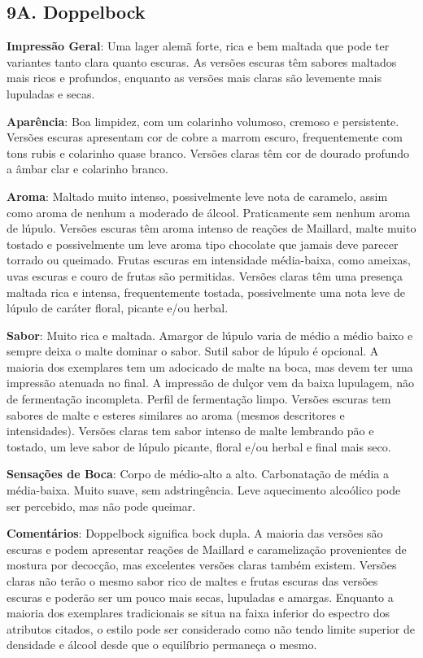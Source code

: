 \subsection*{9A. Doppelbock}

\textbf{Impressão Geral}: Uma lager alemã forte, rica e bem maltada que pode ter variantes tanto clara quanto escuras. As versões escuras têm sabores maltados mais ricos e profundos, enquanto as versões mais claras são levemente mais lupuladas e secas.

\textbf{Aparência}: Boa limpidez, com um colarinho volumoso, cremoso e persistente. Versões escuras apresentam cor de cobre a marrom escuro, frequentemente com tons rubis e colarinho quase branco. Versões claras têm cor de dourado profundo a âmbar clar e colarinho branco.

\textbf{Aroma}: Maltado muito intenso, possivelmente leve nota de caramelo, assim como aroma de nenhum a moderado de álcool. Praticamente sem nenhum aroma de lúpulo. Versões escuras têm aroma intenso de reações de Maillard, malte muito tostado e possivelmente um leve aroma tipo chocolate que jamais deve parecer torrado ou queimado. Frutas escuras em intensidade média-baixa, como ameixas, uvas escuras e couro de frutas são permitidas. Versões claras têm uma presença maltada rica e intensa, frequentemente tostada, possivelmente uma nota leve de lúpulo de caráter floral, picante e/ou herbal.

\textbf{Sabor}: Muito rica e maltada. Amargor de lúpulo varia de médio a médio baixo e sempre deixa o malte dominar o sabor. Sutil sabor de lúpulo é opcional. A maioria dos exemplares tem um adocicado de malte na boca, mas devem ter uma impressão atenuada no final. A impressão de dulçor vem da baixa lupulagem, não de fermentação incompleta. Perfil de fermentação limpo. Versões escuras tem sabores de malte e esteres similares ao aroma (mesmos descritores e intensidades). Versões claras tem sabor intenso de malte lembrando pão e tostado, um leve sabor de lúpulo picante, floral e/ou herbal e final mais seco.

\textbf{Sensações de Boca}: Corpo de médio-alto a alto. Carbonatação de média a média-baixa. Muito suave, sem adstringência. Leve aquecimento alcoólico pode ser percebido, mas não pode queimar.

\textbf{Comentários}: Doppelbock significa bock dupla. A maioria das versões são escuras e podem apresentar reações de Maillard e caramelização provenientes de mostura por decocção, mas excelentes versões claras também existem. Versões claras não terão o mesmo sabor rico de maltes e frutas escuras das versões escuras e poderão ser um pouco mais secas, lupuladas e amargas. Enquanto a maioria dos exemplares tradicionais se situa na faixa inferior do espectro dos atributos citados, o estilo pode ser considerado como não tendo limite superior de densidade e álcool desde que o equilíbrio permaneça o mesmo.

